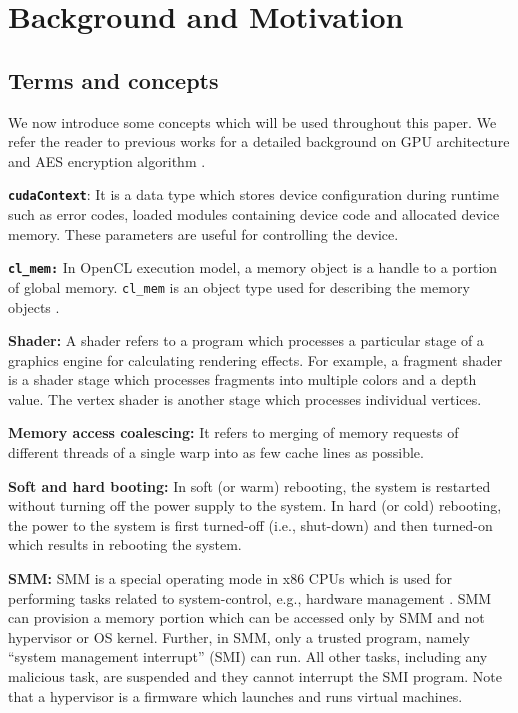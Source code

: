 \section{Background and Motivation}\label{sec:background}
\subsection{Terms and concepts}\label{sec:terms}

We now introduce some concepts which will be used throughout this paper.  We refer the reader to previous works  for a detailed background on  
GPU architecture \cite{mittal2016SurveyGPURF,mittal2014surveyGPUcache,mittal2017design} and AES encryption algorithm \cite{kadam2018rcoal}. 
  
 

\textbf{{\tt cudaContext}}: It is a data type which stores device configuration during runtime such as error codes, loaded modules containing device code and allocated device memory. These parameters are useful for controlling the device. 
  
\textbf{{\tt cl\_mem:}} In OpenCL execution model, a memory object is a handle to a portion of  global memory. {\tt cl\_mem} is an object type used for describing the memory objects \cite{opencl_clmem}.


\textbf{Shader:} A shader refers to a program which processes a particular stage of a graphics engine for calculating rendering effects. For example, a fragment shader is a shader stage which processes fragments into multiple colors and a depth value. The vertex shader is another stage which processes individual vertices. 

\textbf{Memory access coalescing:} It refers to merging of memory requests of different threads of a single warp into as few cache lines as possible. 

\textbf{Soft and hard booting:} In soft (or warm)  rebooting, the system is restarted without turning off the power supply to the system. In hard (or cold) rebooting, the power to the system is first turned-off (i.e., shut-down) and then turned-on which results in rebooting the system.

\textbf{SMM:} SMM is a special operating mode in x86 CPUs which is used for performing tasks related to system-control, e.g., hardware management \cite{kim2016demand}. SMM can provision a memory portion which can be accessed only by SMM and not hypervisor or OS kernel. Further, in SMM, only a trusted program, namely ``system management interrupt'' (SMI) can run. All other tasks, including any malicious task, are suspended and they cannot interrupt the SMI program. Note that a hypervisor is a firmware which launches and runs virtual machines.

